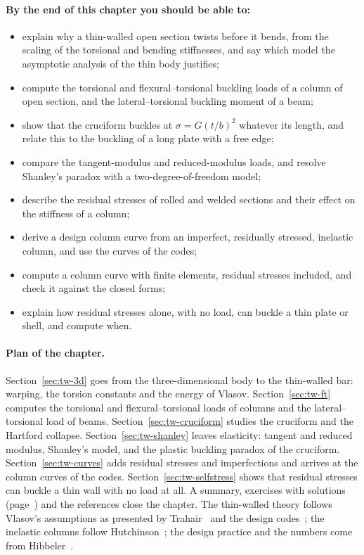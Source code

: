 \paragraph{By the end of this chapter you should be able to:}
\begin{itemize}
  \item explain why a thin-walled open section twists before it bends, from the scaling of
        the torsional and bending stiffnesses, and say which model the asymptotic analysis
        of the thin body justifies;
  \item compute the torsional and flexural--torsional buckling loads of a column of open
        section, and the lateral--torsional buckling moment of a beam;
  \item show that the cruciform buckles at $\sigma = G(t/b)^2$ whatever its length, and relate
        this to the buckling of a long plate with a free edge;
  \item compare the tangent-modulus and reduced-modulus loads, and resolve Shanley's
        paradox with a two-degree-of-freedom model;
  \item describe the residual stresses of rolled and welded sections and their effect on the
        stiffness of a column;
  \item derive a design column curve from an imperfect, residually stressed, inelastic
        column, and use the curves of the codes;
  \item compute a column curve with finite elements, residual stresses included, and check it
        against the closed forms;
  \item explain how residual stresses alone, with no load, can buckle a thin plate or shell, and
        compute when.
\end{itemize}

\paragraph{Plan of the chapter.}
Section~\ref{sec:tw-3d} goes from the three-dimensional body to the thin-walled bar: warping,
the torsion constants and the energy of Vlasov. Section~\ref{sec:tw-ft} computes the torsional and
flexural--torsional loads of columns and the lateral--torsional load of beams.
Section~\ref{sec:tw-cruciform} studies the cruciform and the Hartford collapse.
Section~\ref{sec:tw-shanley} leaves elasticity: tangent and reduced modulus, Shanley's model, and
the plastic buckling paradox of the cruciform. Section~\ref{sec:tw-curves} adds residual stresses
and imperfections and arrives at the column curves of the codes. Section~\ref{sec:tw-selfstress} shows that
residual stresses can buckle a thin wall with no load at all. A summary, exercises with
solutions (page~\pageref{sec:tw-exo}) and the references close the chapter.
The thin-walled theory follows Vlasov's assumptions as presented by Trahair~\cite{tw-trahair1993}
and the design codes~\cite{tw-aisc2022}; the inelastic columns follow Hutchinson~\cite{tw-hutchinson1974};
the design practice and the numbers come from Hibbeler~\cite{tw-hibbeler2014}.

